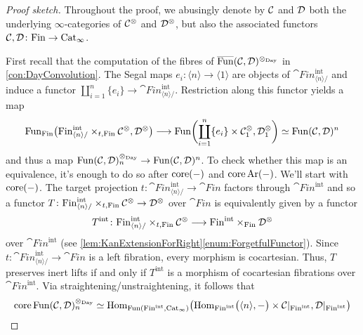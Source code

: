 \begin{proof}[Proof sketch]
	Throughout the proof, we abusingly denote by $\mathcal{C}$ and $\mathcal{D}$ both the underlying $\infty$-categories of $\mathcal{C}^\otimes$ and $\mathcal{D}^\otimes$, but also the associated functors $\mathcal{C},\mathcal{D}\colon \mathrm{Fin}\rightarrow \mathrm{Cat}_\infty$.
	
	First recall that the computation of the fibres of $\ov{\Fun}(\Cc,\Dd)^{\otimes_{\mathrm{Day}}}$ in \cref{con:DayConvolution}. The Segal maps $e_i\colon \langle n\rangle \rightarrow \langle 1\rangle$ are objects of $\cat{Fin}^\mathrm{int}_{\langle n\rangle/}$ and induce a functor $\coprod_{i=1}^n\{e_i\}\rightarrow \cat{Fin}^\mathrm{int}_{\langle n\rangle/}$. Restriction along this functor yields a map
	\begin{equation*}
		\operatorname{Fun}_{\mathrm{Fin}}\bigl(\mathrm{Fin}^\mathrm{int}_{\langle n\rangle/}\times_{t,\mathrm{Fin}}\mathcal{C}^\otimes,\mathcal{D}^\otimes\bigr)\longrightarrow \operatorname{Fun}\biggl(\coprod_{i=1}^n\{e_i\}\times \mathcal{C}^\otimes_1,\mathcal{D}^{\otimes}_1\biggr)\simeq \operatorname{Fun}(\mathcal{C},\mathcal{D})^n
	\end{equation*}
	and thus a map $\operatorname{Fun}(\mathcal{C},\mathcal{D})^{\otimes_{\mathrm{Day}}}_n\rightarrow \operatorname{Fun}(\mathcal{C},\mathcal{D})^n$. To check whether this map is an equivalence, it's enough to do so after $\operatorname{core}(-)$ and $\operatorname{core}\operatorname{Ar}(-)$. We'll start with $\operatorname{core}(-)$. The target projection $t\colon \cat{Fin}^\mathrm{int}_{\langle n\rangle/}\rightarrow \cat{Fin}$ factors through $\cat{Fin}^\mathrm{int}$ and so a functor $T\colon \mathrm{Fin}^\mathrm{int}_{\langle n\rangle/}\times_{t,\mathrm{Fin}}\mathcal{C}^\otimes\rightarrow\mathcal{D}^\otimes$ over $\cat{Fin}$ is equivalently given by a functor
	\begin{equation*}
		T^\mathrm{int}\colon \mathrm{Fin}^\mathrm{int}_{\langle n\rangle/}\times_{t,\mathrm{Fin}}\mathcal{C}^\otimes\longrightarrow\mathrm{Fin}^\mathrm{int}\times_{\mathrm{Fin}}\mathcal{D}^\otimes
	\end{equation*}
	over $\cat{Fin}^\mathrm{int}$ (see \cref{lem:KanExtensionForRight}\cref{enum:ForgetfulFunctor}). Since $t\colon \cat{Fin}^\mathrm{int}_{\langle n\rangle/}\rightarrow \cat{Fin}$ is a left fibration, every morphism is cocartesian. Thus, $T$ preserves inert lifts if and only if $T^\mathrm{int}$ is a morphism of cocartesian fibrations over $\cat{Fin}^\mathrm{int}$. Via straightening/unstraightening, it follows that
	\begin{equation*}
		\core \Fun(\Cc,\Dd)^{\otimes_{\mathrm{Day}}}_n\simeq \Hom_{\Fun(\cat{Fin}^\mathrm{int},\cat{Cat}_\infty)}\left(\Hom_{\cat{Fin}^\mathrm{int}}\bigl(\langle n\rangle,-\bigr)\times \Cc|_{\cat{Fin}^\mathrm{int}},\Dd|_{\cat{Fin}^\mathrm{int}}\right)

\end{equation*}
\end{proof}
